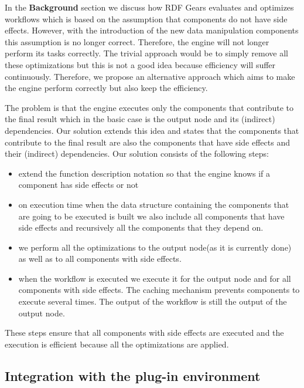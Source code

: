 In the \textbf{Background} section we discuss how RDF Gears evaluates and optimizes workflows which is based on the assumption that components do not have side effects. However, with the introduction of the new data manipulation components this assumption is no longer correct. Therefore, the engine will not longer perform its tasks correctly. The trivial approach would be to simply remove all these optimizations but this is not a good idea because efficiency will suffer continuously. Therefore, we propose an alternative approach which aims to make the engine perform correctly but also keep the efficiency.

The problem is that the engine executes only the components that contribute to the final result which in the basic case is the output node and its (indirect) dependencies. Our solution extends this idea and states that the components that contribute to the final result are also the components that have side effects and their (indirect) dependencies. Our solution consists of the following steps:

\begin{itemize}
	\item extend the function description notation so that the engine knows if a component has side effects or not
	\item on execution time when the data structure containing the components that are going to be executed is built we also include all components that have side effects and recursively all the components that they depend on.
	\item we perform all the optimizations to the output node(as it is currently done) as well as to all components with side effects. 
	\item when the workflow is executed we execute it for the output node and for all components with side effects. The caching mechanism prevents components to execute several times. The output of the workflow is still the output of the output node.
\end{itemize}

These steps ensure that all components with side effects are executed and the execution is efficient because all the optimizations are applied.

\subsection{Integration with the plug-in environment}

